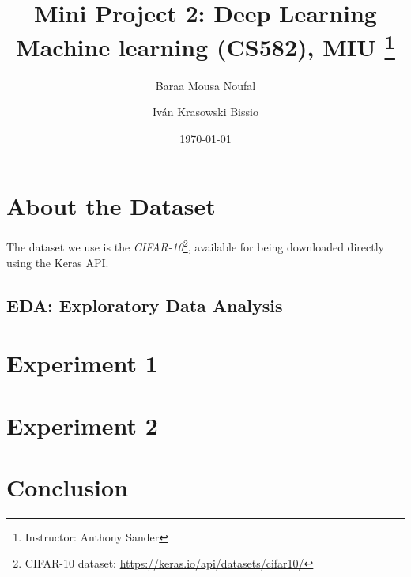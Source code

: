 \documentclass[titlepage, 11pt]{article}
\title{
	\textbf{Mini Project 2: Deep Learning} \\
	Machine learning (CS582), MIU \thanks{Instructor: Anthony Sander}
}
\author{
    Baraa Mousa Noufal \and Iván Krasowski Bissio
}
\date{\today}
\begin{document}
\maketitle
\tableofcontents

\begin{abstract}
	
\end{abstract}

\section{About the Dataset}
The dataset we use is the \emph{CIFAR-10}\footnote{CIFAR-10 dataset: \href{https://keras.io/api/datasets/cifar10/}{https://keras.io/api/datasets/cifar10/}},
available for being downloaded directly using the Keras API.

\subsection{EDA: Exploratory Data Analysis}


\section{Experiment 1}


\section{Experiment 2}


\clearpage
\section{Conclusion}

\end{document}
